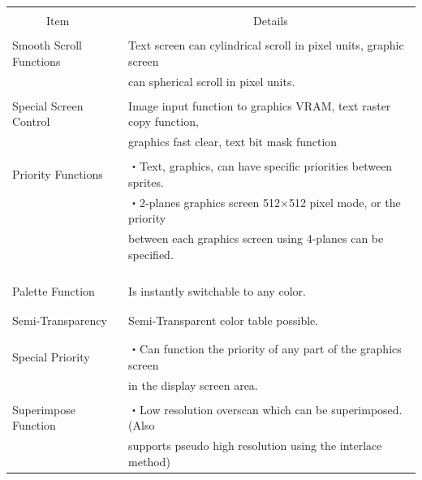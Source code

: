 ﻿\documentclass[twoside,a4paper,12pt]{article}
\begin{document}
\setlength{\tabcolsep}{0.5mm}
\begin{tabular}{|p{44mm}|p{123mm}|}
\hline
&\\[-2mm]
\ \ \ \ \ \ Item & \ \ \ \ \ \ \ \ \ \ \ \ \ \ \ \ \ \ \ \ \ \ Details\\[4mm]
\hline
&\\[-3mm]
Smooth Scroll Functions & Text screen can cylindrical scroll in pixel units, graphic screen\\
& can spherical scroll in pixel units.\\
\hline
&\\[-3mm]
Special Screen Control & Image input function to graphics VRAM, text raster copy function,\\
& graphics fast clear, text bit mask function\\
\hline
&\\[-3mm]
Priority Functions & ・Text, graphics, can have specific priorities between sprites.\\
& ・2-planes graphics screen 512×512 pixel mode, or the priority\\
& between each graphics screen using 4-planes can be specified.\\
&\\
&\\
&\\
\hline
&\\[-3mm]
Palette Function & Is instantly switchable to any color.\\
&\\
\hline
&\\[-3mm]
Semi-Transparency & Semi-Transparent color table possible.\\
&\\
\hline
&\\[-3mm]
Special Priority & ・Can function the priority of any part of the graphics screen\\
& in the display screen area.\\
\hline
&\\[-3mm]
Superimpose Function & ・Low resolution overscan which can be superimposed. (Also\\
& supports pseudo high resolution using the interlace method)\\
\hline
\end{tabular}\\[1mm]
\end{document}
